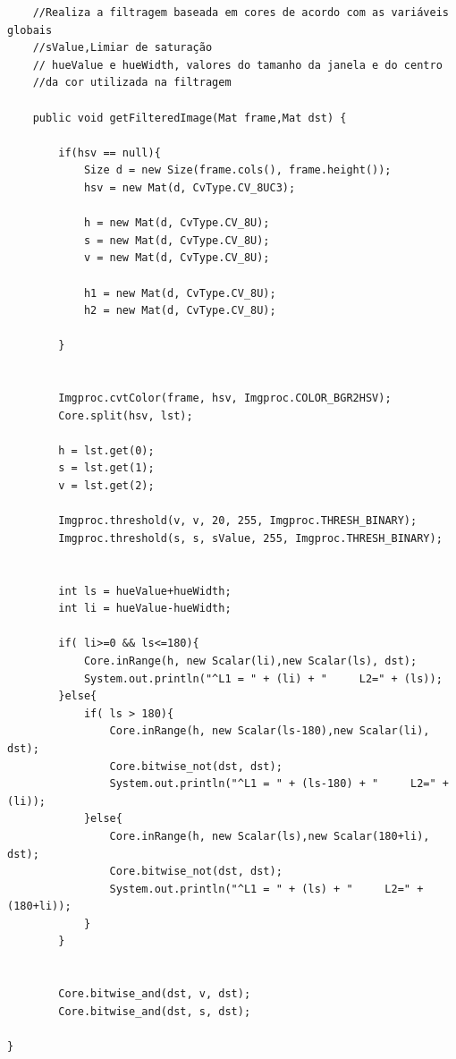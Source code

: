 \documentclass[
	article,			%
	11pt,				%
	oneside,			%
	a4paper,			%
	english,			%
	brazil,				%
	sumario=tradicional
	]{abntex2}
\begin{document}
\begin{apendicesenv}
\begin{lstlisting}
	//Realiza a filtragem baseada em cores de acordo com as variáveis globais
	//sValue,Limiar de saturação
	// hueValue e hueWidth, valores do tamanho da janela e do centro 
	//da cor utilizada na filtragem
	 
	public void getFilteredImage(Mat frame,Mat dst) {
		
		if(hsv == null){
			Size d = new Size(frame.cols(), frame.height());
			hsv = new Mat(d, CvType.CV_8UC3);
			
			h = new Mat(d, CvType.CV_8U);
			s = new Mat(d, CvType.CV_8U);
			v = new Mat(d, CvType.CV_8U);
			
			h1 = new Mat(d, CvType.CV_8U);
			h2 = new Mat(d, CvType.CV_8U);
		
		}
		
		
		Imgproc.cvtColor(frame, hsv, Imgproc.COLOR_BGR2HSV);
	    Core.split(hsv, lst);
		
	    h = lst.get(0);
	    s = lst.get(1);
	    v = lst.get(2);
	    
		Imgproc.threshold(v, v, 20, 255, Imgproc.THRESH_BINARY);
		Imgproc.threshold(s, s, sValue, 255, Imgproc.THRESH_BINARY);
		
		
		int ls = hueValue+hueWidth;
		int li = hueValue-hueWidth;
		
		if( li>=0 && ls<=180){
			Core.inRange(h, new Scalar(li),new Scalar(ls), dst);
			System.out.println("^L1 = " + (li) + "     L2=" + (ls));
		}else{
			if( ls > 180){
				Core.inRange(h, new Scalar(ls-180),new Scalar(li), dst);
				Core.bitwise_not(dst, dst);
				System.out.println("^L1 = " + (ls-180) + "     L2=" + (li));
			}else{
				Core.inRange(h, new Scalar(ls),new Scalar(180+li), dst);
				Core.bitwise_not(dst, dst);
				System.out.println("^L1 = " + (ls) + "     L2=" + (180+li));
			}
		}
			
		
		Core.bitwise_and(dst, v, dst);
		Core.bitwise_and(dst, s, dst);

} 
\end{lstlisting}

\end{apendicesenv}



\end{document}
